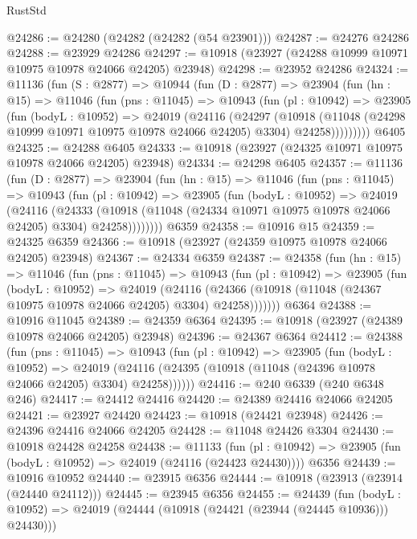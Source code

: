 \begin{lexlean}{RustStd}
\begin{coremodule}
{{{{{{{{{{{{{{{{{{{@24286 := @24280 (@24282 (@24282 (@54 @23901)))
@24287 := @24276 @24286
@24288 := @23929 @24286
@24297 := @10918 (@23927 (@24288 @10999 @10971 @10975 @10978 @24066 @24205) @23948)
@24298 := @23952 @24286
@24324 := @11136
    (fun (S : @2877) =>
    @10944
      (fun (D : @2877) =>
      @23904
        (fun (hn : @15) =>
        @11046
          (fun (pns : @11045) =>
          @10943
            (fun (pl : @10942) =>
            @23905
              (fun (bodyL : @10952) =>
              @24019
                (@24116
                  (@24297
                    (@10918
                      (@11048 (@24298 @10999 @10971 @10975 @10978 @24066 @24205) @3304)
                      @24258)))))))))
    @6405
@24325 := @24288 @6405
@24333 := @10918 (@23927 (@24325 @10971 @10975 @10978 @24066 @24205) @23948)
@24334 := @24298 @6405
@24357 := @11136
    (fun (D : @2877) =>
    @23904
      (fun (hn : @15) =>
      @11046
        (fun (pns : @11045) =>
        @10943
          (fun (pl : @10942) =>
          @23905
            (fun (bodyL : @10952) =>
            @24019
              (@24116
                (@24333
                  (@10918 (@11048 (@24334 @10971 @10975 @10978 @24066 @24205) @3304) @24258))))))))
    @6359
@24358 := @10916 @15
@24359 := @24325 @6359
@24366 := @10918 (@23927 (@24359 @10975 @10978 @24066 @24205) @23948)
@24367 := @24334 @6359
@24387 := @24358
    (fun (hn : @15) =>
    @11046
      (fun (pns : @11045) =>
      @10943
        (fun (pl : @10942) =>
        @23905
          (fun (bodyL : @10952) =>
          @24019
            (@24116
              (@24366 (@10918 (@11048 (@24367 @10975 @10978 @24066 @24205) @3304) @24258)))))))
    @6364
@24388 := @10916 @11045
@24389 := @24359 @6364
@24395 := @10918 (@23927 (@24389 @10978 @24066 @24205) @23948)
@24396 := @24367 @6364
@24412 := @24388
    (fun (pns : @11045) =>
    @10943
      (fun (pl : @10942) =>
      @23905
        (fun (bodyL : @10952) =>
        @24019 (@24116 (@24395 (@10918 (@11048 (@24396 @10978 @24066 @24205) @3304) @24258))))))
@24416 := @240 @6339 (@240 @6348 @246)
@24417 := @24412 @24416
@24420 := @24389 @24416 @24066 @24205
@24421 := @23927 @24420
@24423 := @10918 (@24421 @23948)
@24426 := @24396 @24416 @24066 @24205
@24428 := @11048 @24426 @3304
@24430 := @10918 @24428 @24258
@24438 := @11133
    (fun (pl : @10942) => @23905 (fun (bodyL : @10952) => @24019 (@24116 (@24423 @24430))))
    @6356
@24439 := @10916 @10952
@24440 := @23915 @6356
@24444 := @10918 (@23913 (@23914 (@24440 @24112)))
@24445 := @23945 @6356
@24455 := @24439
    (fun (bodyL : @10952) => @24019 (@24444 (@10918 (@24421 (@23944 (@24445 @10936))) @24430)))
}}}}}}}}}}}}}}}}}}}
\end{coremodule}
\end{lexlean}
